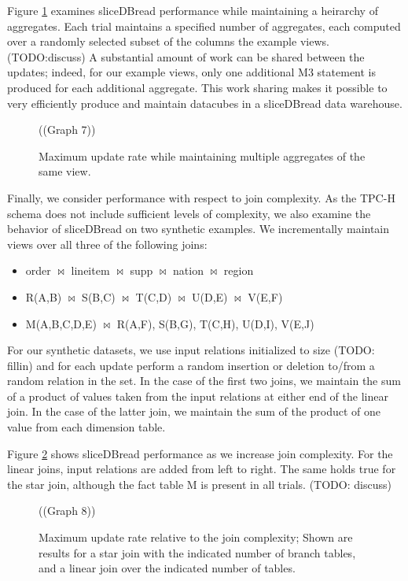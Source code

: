 Figure \ref{fig:scalingdatacube} examines sliceDBread performance while maintaining a heirarchy of aggregates.  Each trial maintains a specified number of aggregates, each computed over a randomly selected subset of the columns the example views.  (TODO:discuss)  A substantial amount of work can be shared between the updates; indeed, for our example views, only one additional M3 statement is produced for each additional aggregate.  This work sharing makes it possible to very efficiently produce and maintain datacubes in a sliceDBread data warehouse.

\begin{figure}
\begin{center}
((Graph 7))
\caption{Maximum update rate while maintaining multiple aggregates of the same view.}
\label{fig:scalingdatacube}
\end{center}
\end{figure}


Finally, we consider performance with respect to join complexity.  As the TPC-H schema does not include sufficient levels of complexity, we also examine the behavior of sliceDBread on two synthetic examples.  We incrementally maintain views over all three of the following joins:
\begin{itemize}
\item order $\bowtie$ lineitem $\bowtie$ supp $\bowtie$ nation $\bowtie$ region
\item R(A,B) $\bowtie$ S(B,C) $\bowtie$ T(C,D) $\bowtie$ U(D,E) $\bowtie$ V(E,F)
\item M(A,B,C,D,E) $\bowtie$ R(A,F), S(B,G), T(C,H), U(D,I), V(E,J)
\end{itemize}
For our synthetic datasets, we use input relations initialized to size (TODO: fillin) and for each update perform a random insertion or deletion to/from a random relation in the set.  In the case of the first two joins, we maintain the sum of a product of values taken from the input relations at either end of the linear join.  In the case of the latter join, we maintain the sum of the product of one value from each dimension table.

Figure \ref{fig:scalingjoincomplexity} shows sliceDBread performance as we increase join complexity.  For the linear joins, input relations are added from left to right.  The same holds true for the star join, although the fact table M is present in all trials. (TODO: discuss)

\begin{figure}
((Graph 8))
\caption{Maximum update rate relative to the join complexity; Shown are results for a star join with the indicated number of branch tables, and a linear join over the indicated number of tables.}
\label{fig:scalingjoincomplexity}
\end{figure}



